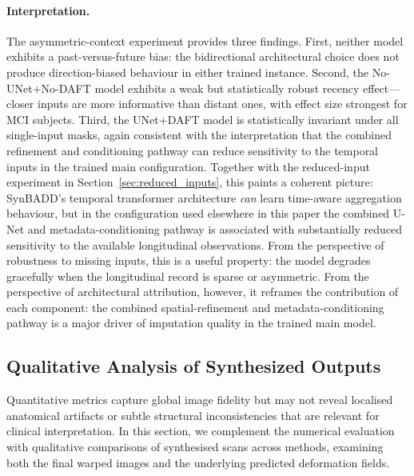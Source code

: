 \paragraph{Interpretation.} The asymmetric-context experiment provides three findings. First, neither model exhibits a past-versus-future bias: the bidirectional architectural choice does not produce direction-biased behaviour in either trained instance. Second, the No-UNet$+$No-DAFT model exhibits a weak but statistically robust recency effect---closer inputs are more informative than distant ones, with effect size strongest for MCI subjects. Third, the UNet$+$DAFT model is statistically invariant under all single-input masks, again consistent with the interpretation that the combined refinement and conditioning pathway can reduce sensitivity to the temporal inputs in the trained main configuration. Together with the reduced-input experiment in Section~\ref{sec:reduced_inputs}, this paints a coherent picture: SynBADD's temporal transformer architecture \emph{can} learn time-aware aggregation behaviour, but in the configuration used elsewhere in this paper the combined U-Net and metadata-conditioning pathway is associated with substantially reduced sensitivity to the available longitudinal observations. From the perspective of robustness to missing inputs, this is a useful property: the model degrades gracefully when the longitudinal record is sparse or asymmetric. From the perspective of architectural attribution, however, it reframes the contribution of each component: the combined spatial-refinement and metadata-conditioning pathway is a major driver of imputation quality in the trained main model.


\subsection{Qualitative Analysis of Synthesized Outputs}
\label{sec:qualitative}

Quantitative metrics capture global image fidelity but may not reveal localised anatomical artifacts or subtle structural inconsistencies that are relevant for clinical interpretation. In this section, we complement the numerical evaluation with qualitative comparisons of synthesised scans across methods, examining both the final warped images and the underlying predicted deformation fields.

